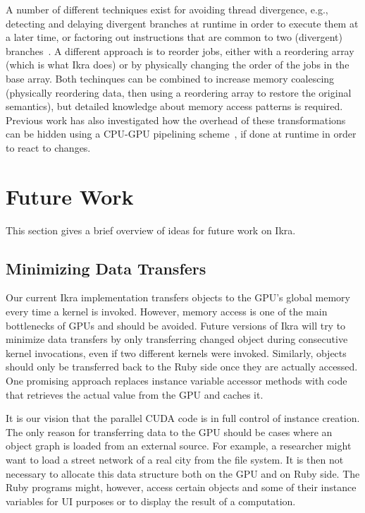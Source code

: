 \documentclass[preprint]{sigplanconf}
\begin{document}
A number of different techniques exist for avoiding thread divergence, e.g., detecting and delaying divergent branches at runtime in order to execute them at a later time, or factoring out instructions that are common to two (divergent) branches~\cite{Han:2011:RBD:1964179.1964184}. A different approach is to reorder jobs, either with a reordering array (which is what Ikra does) or by physically changing the order of the jobs in the base array. Both techinques can be combined to increase memory coalescing~\cite{Zhang:2011:OED:1950365.1950408} (physically reordering data, then using a reordering array to restore the original semantics), but detailed knowledge about memory access patterns is required. Previous work has also investigated how the overhead of these transformations can be hidden using a CPU-GPU pipelining scheme~\cite{Zhang:2010:SGA:1810085.1810104}, if done at runtime in order to react to changes.

\section{Future Work}
This section gives a brief overview of ideas for future work on Ikra.

\subsection{Minimizing Data Transfers}
Our current Ikra implementation transfers objects to the GPU's global memory every time a kernel is invoked. However, memory access is one of the main bottlenecks of GPUs and should be avoided. Future versions of Ikra will try to minimize data transfers by only transferring changed object during consecutive kernel invocations, even if two different kernels were invoked. Similarly, objects should only be transferred back to the Ruby side once they are actually accessed. One promising approach replaces instance variable accessor methods with code that retrieves the actual value from the GPU and caches it.

It is our vision that the parallel CUDA code is in full control of instance creation. The only reason for transferring data to the GPU should be cases where an object graph is loaded from an external source. For example, a researcher might want to load a street network of a real city from the file system. It is then not necessary to allocate this data structure both on the GPU and on Ruby side. The Ruby programs might, however, access certain objects and some of their instance variables for UI purposes or to display the result of a computation.
\end{document}
